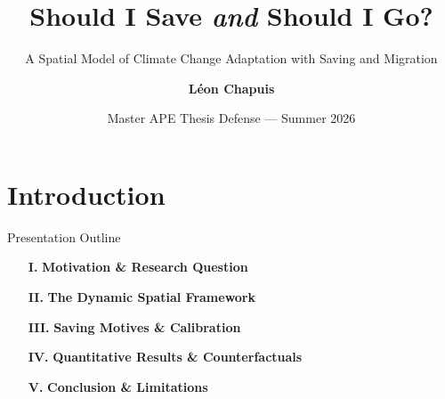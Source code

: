 \documentclass[aspectratio=169, 10pt]{beamer}
\title[Should I Save \textit{and} Should I Go?]{\textbf{Should I Save \textit{and} Should I Go?}}
\subtitle{A Spatial Model of Climate Change Adaptation with Saving and Migration}
\author[L. Chapuis]{\textbf{Léon Chapuis}}
\institute[PSE / ENS--PSL]{Paris School of Economics / École normale supérieure--PSL}
\date[Summer 2026]{Master APE Thesis Defense --- Summer 2026}
\begin{document}
\begin{frame}
  \titlepage
\end{frame}

\section{Introduction}

\begin{frame}{Presentation Outline}\label{main:outline}
    \begin{enumerate}\setlength{\itemsep}{6pt}
        \item[\textbf{I.}] \textbf{Motivation \& Research Question} 
        \item[\textbf{II.}] \textbf{The Dynamic Spatial Framework}
        \item[\textbf{III.}] \textbf{Saving Motives \& Calibration} 
        \item[\textbf{IV.}] \textbf{Quantitative Results \& Counterfactuals}
        \item[\textbf{V.}] \textbf{Conclusion \& Limitations} 
    \end{enumerate}
\end{frame}
\end{document}
